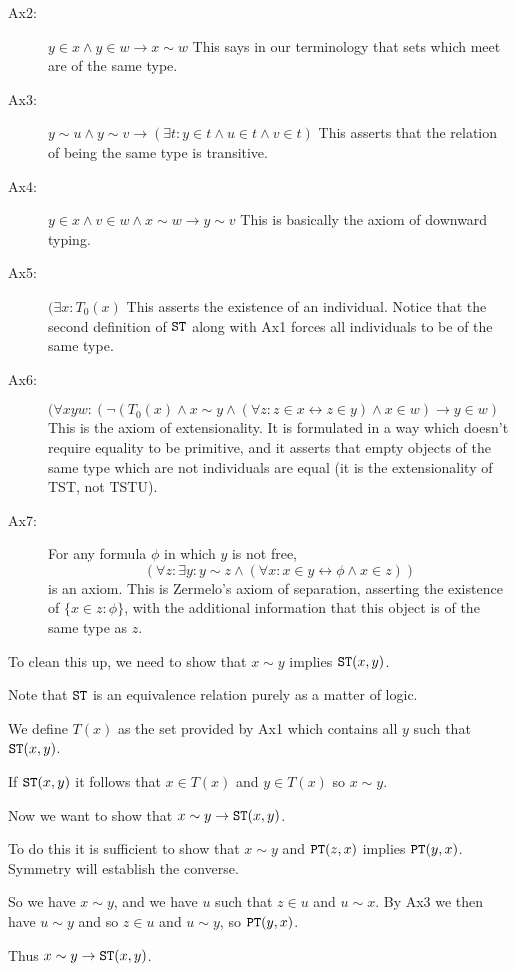 \documentclass{slides}
\begin{document}
\begin{slide}
\begin{description}
\item[Ax2:]  $y \in x \wedge y \in w \rightarrow x \sim w$  This says in our terminology that sets which meet are of the same type.

\item[Ax3:]  $y \sim u \wedge y \sim v \rightarrow (\exists t:y  \in t \wedge u \in t \wedge v \in t)$  This asserts that the relation of being the same type is transitive. 

\item[Ax4:]  $y \in x \wedge v \in w \wedge x \sim w \rightarrow y \sim v$  This is basically the axiom of downward typing.

\item[Ax5:]  $(\exists x:T_0(x)$  This asserts the existence of an individual.  Notice that the second definition of ${\tt ST}$ along with Ax1 forces all individuals to be of the same type.

\item[Ax6:]  $(\forall xyw:  (\neg(T_0(x) \wedge x \sim y \wedge (\forall z:z \in x \leftrightarrow z \in y) \wedge x \in w) \rightarrow y \in w)$  This is the axiom of extensionality.  It is formulated in a way which doesn't require equality to be primitive, and it asserts that
empty objects of the same type which are not individuals are equal (it is the extensionality of TST, not TSTU).

\item[Ax7:]  For any formula $\phi$ in which $y$ is not free, $$(\forall z: \exists y:y \sim z \wedge (\forall x:x \in y \leftrightarrow \phi \wedge x \in z))$$ is an axiom. This is Zermelo's axiom of separation, asserting the existence of \newline $\{x \in z:\phi\}$, with the additional information that this object is of the same type as $z$.

\end{description}

\end{slide}

\begin{slide}

To clean this up, we need to show that $x \sim y$ implies ${\tt ST}(x,y)$.

Note that ${\tt ST}$ is an equivalence relation purely as a matter of logic.

We define $T(x)$ as the set provided by Ax1 which contains all $y$ such that ${\tt ST}(x,y)$.

If ${\tt ST}(x,y)$ it follows that $x \in T(x)$ and $y \in T(x)$ so $x \sim y$.

Now we want to show that $x \sim y \rightarrow {\tt ST}(x,y)$.

To do this it is sufficient to show that $x \sim y$ and ${\tt PT}(z,x)$ implies ${\tt PT}(y,x)$.  Symmetry will establish the converse.

So we have $x \sim y$, and we have $u$ such that $z \in u$ and $u \sim x$.  By Ax3 we then have $u \sim y$ and so $z \in u$ and $u \sim y$, so ${\tt PT}(y,x)$.

Thus $x \sim y \rightarrow {\tt ST}(x,y)$.


\end{slide}
\end{document}
